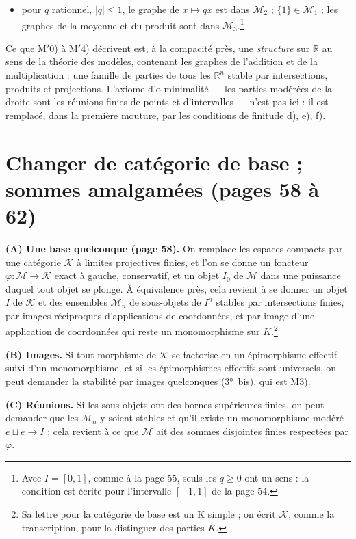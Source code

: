 \documentclass[11pt,a4paper]{article}
\begin{document}
\begin{itemize}
\item[M$'$4)] pour $q$ rationnel, $|q| \leqslant 1$, le graphe de $x \mapsto
  qx$ est dans $\mathcal{M}_2$ ; $\{1\} \in \mathcal{M}_1$ ; les graphes de la
  moyenne et du produit sont dans $\mathcal{M}_3$.\footnote{Avec $I = [0,1]$,
  comme à la page 55, seuls les $q \geqslant 0$ ont un sens : la condition est
  écrite pour l'intervalle $[-1,1]$ de la page 54.}
\end{itemize}

Ce que M$'$0) à M$'$4) décrivent est, à la compacité près, une
\emph{structure} sur $\mathbb{R}$ au sens de la théorie des modèles, contenant
les graphes de l'addition et de la multiplication : une famille de parties de
tous les $\mathbb{R}^n$ stable par intersections, produits et projections.
L'axiome d'o-minimalité — les parties modérées de la droite sont les
réunions finies de points et d'intervalles — n'est pas ici : il est remplacé,
dans la première mouture, par les conditions de finitude d), e), f).

\section*{Changer de catégorie de base ; sommes amalgamées (pages 58 à 62)}

\textbf{(A) Une base quelconque (page 58).} On remplace les espaces compacts par
une catégorie $\mathcal{K}$ à limites projectives finies, et l'on se donne un
foncteur $\varphi : \mathcal{M} \to \mathcal{K}$ exact à gauche, conservatif,
et un objet $I_0$ de $\mathcal{M}$ dans une puissance duquel tout objet se
plonge. À équivalence près, cela revient à se donner un objet $I$ de
$\mathcal{K}$ et des ensembles $\mathcal{M}_n$ de sous-objets de $I^n$ stables
par intersections finies, par images réciproques d'applications de
coordonnées, et par image d'une application de coordonnées qui reste un
monomorphisme sur $K$.\footnote{Sa lettre pour la catégorie de base est un K
simple ; on écrit $\mathcal{K}$, comme la transcription, pour la distinguer des
parties $K$.}

\textbf{(B) Images.} Si tout morphisme de $\mathcal{K}$ se factorise en un
épimorphisme effectif suivi d'un monomorphisme, et si les épimorphismes
effectifs sont universels, on peut demander la stabilité par images
quelconques (3°~bis), qui est M3).

\textbf{(C) Réunions.} Si les sous-objets ont des bornes supérieures finies, on
peut demander que les $\mathcal{M}_n$ y soient stables et qu'il existe un
monomorphisme modéré $e \sqcup e \to I$ ; cela revient à ce que $\mathcal{M}$
ait des sommes disjointes finies respectées par $\varphi$.
\end{document}
